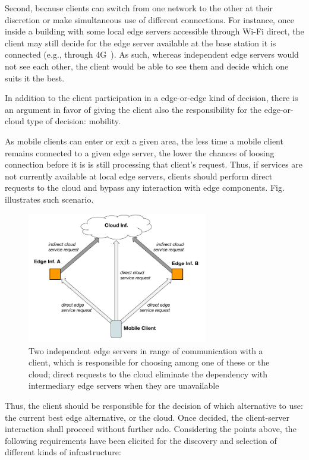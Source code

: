 Second, because clients can switch from one network to the other at their discretion or make simultaneous use of different connections. For instance, once inside a building with some local edge servers accessible through Wi-Fi direct, the client may still decide for the edge server available at the base station it is connected (e.g., through 4G~\cite{4G}). As such, whereas independent edge servers would not see each other, the client would be able to see them and decide which one suits it the best.

In addition to the client participation in a edge-or-edge kind of decision, there is an argument in favor of giving the client also the responsibility for the edge-or-cloud type of decision: mobility. 

As mobile clients can enter or exit a given area, the less time a mobile client remains connected to a given edge server, the lower the chances of loosing connection before it is is still processing that client's request. Thus, if services are not currently available at local edge servers, clients should perform direct requests to the cloud and bypass any interaction with edge components. Fig. illustrates such scenario.

\begin{figure}
  \includegraphics[width=0.7\textwidth]{figs/domain-selection.png}
  \caption{Two independent edge servers in range of communication with a client, which is responsible for choosing among one of these or the cloud; direct requests to the cloud eliminate the dependency with intermediary edge servers when they are unavailable}
  \label{fig:domain-selection}
\end{figure}


Thus, the client should be responsible for the decision of which alternative to use: the current best edge alternative, or the cloud. Once decided, the client-server interaction shall proceed without further ado.
Considering the points above, the following requirements have been elicited for the discovery and selection of different kinds of infrastructure:

